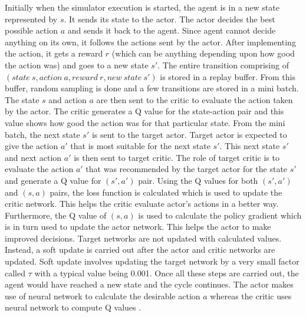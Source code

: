 Initially when the simulator execution is started, the agent is in a new state represented by $s$. It sends its state to the actor. The actor decides the best possible action $a$ and sends it back to the agent. Since agent cannot decide anything on its own, it follows the actions sent by the actor. After implementing the action, it gets a reward $r$ (which can be anything depending upon how good the action was) and goes to a new state $s'$. The entire transition comprising of $(state \ s, action \ a, reward \ r, new \ state \ s')$ is stored in a replay buffer. From this buffer, random sampling is done and a few transitions are stored in a mini batch. The state $s$ and action $a$ are then sent to the critic to evaluate the action taken by the actor. The critic generates a Q value for the state-action pair and this value shows how good the action was for that particular state. From the mini batch, the next state $s'$ is sent to the target actor. Target actor is expected to give the action $a'$ that is most suitable for the next state $s'$. This next state $s'$ and next action $a'$ is then sent to target critic. The role of target critic is to evaluate the action $a'$ that was recommended by the target actor for the state $s'$ and generate a Q value for $(s', a')$ pair. Using the Q values for both $(s', a')$ and $(s, a)$ pairs, the loss function is calculated which is used to update the critic network. This helps the critic evaluate actor's actions in a better way. Furthermore, the Q value of $(s, a)$ is used to calculate the policy gradient which is in turn used to update the actor network. This helps the actor to make improved decisions. Target networks are not updated with calculated values. Instead, a soft update is carried out after the actor and critic networks are updated. Soft update involves updating the target network by a very small factor called $\tau$ with a typical value being 0.001. Once all these steps are carried out, the agent would have reached a new state and the cycle continues. The actor makes use of neural network to calculate the desirable action $a$ whereas the critic uses neural network to compute Q values \cite{lillicrap2015continuous}. 



 
